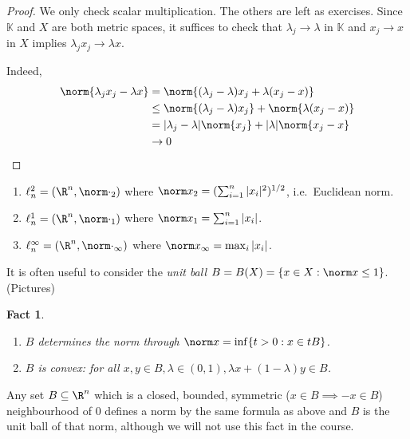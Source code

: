 \documentclass[a4paper]{article}
\newtheorem*{fact}{Fact}
\newcommand{\K}{{\mathbb{K}}} %
\begin{document}
\begin{proof}
  We only check scalar multiplication. The others are left as exercises. Since \(\K\) and \(X\) are both metric spaces, it suffices to check that \(\lambda_j \to \lambda\) in \(\K\) and \(x_j \to x\) in \(X\) implies \(\lambda_j x_j \to \lambda x\).

  Indeed,
  \begin{align*}
    \norm{\lambda_j x_j - \lambda x}
    &= \norm{(\lambda_j - \lambda) x_j + \lambda(x_j - x)} \\
    &\leq \norm{(\lambda_j - \lambda) x_j} + \norm{\lambda(x_j - x)} \\
    &= |\lambda_j - \lambda| \norm{x_j} +|\lambda| \norm{x_j - x} \\
    &\to 0
  \end{align*}
\end{proof}

\begin{eg}\leavevmode
  \begin{enumerate}
  \item \(\ell_n^2 = (\R^n, \norm \cdot_2)\) where \(\norm x_2 = (\sum_{i = 1}^n |x_i|^2)^{1/2}\), i.e.\ Euclidean norm.
  \item \(\ell_n^1 = (\R^n, \norm \cdot_1)\) where \(\norm x_1 = \sum_{i = 1}^n |x_i|\).
  \item \(\ell_n^\infty = (\R^n, \norm \cdot_\infty)\) where \(\norm x_\infty = \max_i |x_i|\).
  \end{enumerate}
\end{eg}

It is often useful to consider the \emph{unit ball} \(B = B(X) = \{x \in X: \norm x \leq 1\}\). (Pictures)

\begin{fact}\leavevmode
\begin{enumerate}
\item \(B\) determines the norm through \(\norm x = \inf \{t > 0: x \in tB\}\).
\item \(B\) is \emph{convex}: for all \(x, y \in B, \lambda \in (0, 1), \lambda x + (1 - \lambda) y \in B\).
\end{enumerate}
\end{fact}

\begin{remark}
  Any set \(B \subseteq \R^n\) which is a closed, bounded, symmetric (\(x \in B \implies -x \in B\)) neighbourhood of \(0\) defines a norm by the same formula as above and \(B\) is the unit ball of that norm, although we will not use this fact in the course.
\end{remark}
\end{document}
